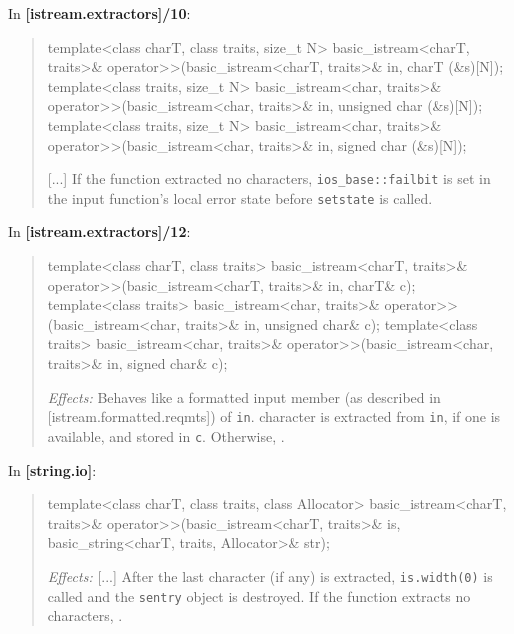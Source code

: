 \documentclass{wg21}
\begin{document}
In \textbf{[istream.extractors]/10}:
\begin{quote}
\begin{codeblock}
template<class charT, class traits, size_t N>
  basic_istream<charT, traits>& operator>>(basic_istream<charT, traits>& in, charT (&s)[N]);
template<class traits, size_t N>
  basic_istream<char, traits>& operator>>(basic_istream<char, traits>& in, unsigned char (&s)[N]);
template<class traits, size_t N>
  basic_istream<char, traits>& operator>>(basic_istream<char, traits>& in, signed char (&s)[N]);
\end{codeblock}
[...]
If the function extracted no characters, 
{\texttt{ios_base::failbit} is set in the input function's local error state
before \texttt{setstate} is called}.
\end{quote}

In \textbf{[istream.extractors]/12}:
\begin{quote}
\begin{codeblock}
template<class charT, class traits>
  basic_istream<charT, traits>& operator>>(basic_istream<charT, traits>& in, charT& c);
template<class traits>
  basic_istream<char, traits>& operator>>(basic_istream<char, traits>& in, unsigned char& c);
template<class traits>
  basic_istream<char, traits>& operator>>(basic_istream<char, traits>& in, signed char& c);
\end{codeblock}
\textit{Effects:} Behaves like a formatted input member (as described in [istream.formatted.reqmts])
of \texttt{in}.  character
is extracted from \texttt{in}, if one is available, and stored in \texttt{c}.
Otherwise, .
\end{quote}

In \textbf{[string.io]}:
\begin{quote}
\begin{codeblock}
template<class charT, class traits, class Allocator>
  basic_istream<charT, traits>&
    operator>>(basic_istream<charT, traits>& is, basic_string<charT, traits, Allocator>& str);
\end{codeblock}
\textit{Effects:} [...]
After the last character (if any) is extracted, \texttt{is.width(0)} is called
and the \texttt{sentry} object is destroyed. If the function extracts no characters,
.
\end{quote}
\end{document}
